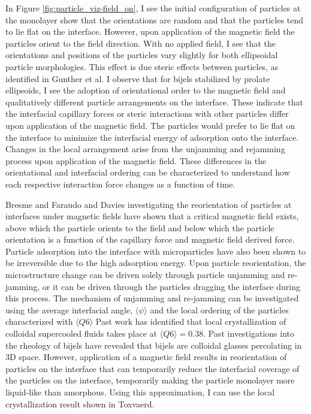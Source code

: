 In Figure \ref{fig:particle_viz-field_on}, I see the initial configuration of particles at the monolayer show that the orientations are random and that the 
particles tend to lie flat on the interface. However, upon application of the magnetic field the particles orient to the field direction. With no applied field,
I see that the orientations and positions of the particles vary slightly for both ellipsoidal particle morphologies. This effect is due steric effects between particles,
as identified in Gunther et al. \cite{gunther_timescales_2014} I observe that for bijels stabilized by prolate ellipsoids, I see the adoption of orientational order
to the magnetic field and qualitatively different particle arrangements on the interface. These indicate that the interfacial capillary forces or steric interactions 
with other particles differ upon application of the magnetic field. The particles would prefer to lie flat on the interface to minimize the interfacial energy of 
adsorption onto the interface. Changes in the local arrangement arise from the unjamming and rejamming process upon application of the magnetic field. These differences 
in the orientational and interfacial ordering can be characterized to understand how each respective interaction force changes as a function of time.

Bresme and Faraudo and Davies investigating the reorientation of particles at interfaces under magnetic fields have shown that a critical magnetic field exists, 
above which the particle orients to the field and below which the particle orientation is a function of the capillary force and magnetic field derived force. 
\cite{davies_interface_2014} \cite{bresme_orientational_2007} Particle adsorption into the interface with microparticles have also been shown to be irreversible due 
to the high adsorption energy. Upon particle reorientation, the microstructure change can be driven solely through particle unjamming and re-jamming, or it can be 
driven through the particles dragging the interface during this process. The mechanism of unjamming and re-jamming can be investigated using the average interfacial 
angle, $\langle \psi \rangle$ and the local ordering of the particles characterized with  $\langle Q6 \rangle$ Past work has identified that local crystallization 
of colloidal supercooled fluids takes place at \(\langle Q6 \rangle = 0.38\). \cite{toxvaerd_role_2020} Past investigations into the rheology of bijels have revealed
that bijels are colloidal glasses percolating in 3D space. \cite{ching_bijel_2022} However, application of a magnetic field results in reorientation of particles on
the interface that can temporarily reduce the interfacial coverage of the particles on the interface, temporarily making the particle monolayer more liquid-like
than amorphous. \cite{hunter_physics_2012} Using this approximation, I can use the local crystallization result shown in Toxvaerd.

